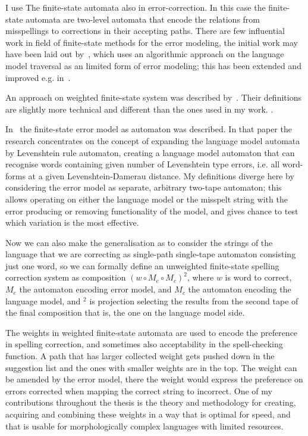 \documentclass[officiallayout,draft]{unihelcompling}
\begin{document}
I use The finite-state automata also in error-correction. In this case the
finite-state automata are two-level automata that encode the relations from
misspellings to corrections in their accepting paths. There are few influential
work in field of finite-state methods for the error modeling, the initial work
may have been laid out by~\citet{oflazer1996errortolerant}, which uses an
algorithmic approach on the language model traversal as an limited form of
error modeling; this has been extended and improved e.g. 
in~\citet{hulden2009fast}. 

An approach on weighted finite-state system was described
by~\citet{mohri2003edit}. Their definitions are slightly more technical and
different than the ones used in my work. .

In~\citet{agata2002typographical} the finite-state error model as automaton was
described. In that paper the research concentrates on the concept of expanding
the language model automata by Levenshtein rule automaton, creating a language
model automaton that can recognise words containing given number of Levenshtein
type errors, i.e. all word-forms at a given Levenshtein-Damerau distance. My
definitions diverge here by considering the error model as separate, arbitrary
two-tape automaton; this allows operating on either the language model or the
misspelt string with the error producing or removing functionality of the
model, and gives chance to test which variation is the most effective. 

Now we can also make the generalisation as to consider the strings of the
language that we are correcting as single-path single-tape automaton consisting
just one word, so we can formally define an unweighted finite-state spelling
correction system as composition $(w \circ M_e \circ M_c)^2$, where $w$ is word
to correct, $M_e$ the automaton encoding error model, and $M_c$ the automaton
encoding the language model, and $^2$ is projection selecting the results from
the second tape of the final composition that is, the one on the language
model side.

The weights in weighted finite-state automata are used to encode the preference
in spelling correction, and sometimes also acceptability in the spell-checking
function. A path that has larger collected weight gets pushed down in the
suggestion list and the ones with smaller weights are in the top. The weight
can be amended by the error model, there the weight would express the
preference on errors corrected when mapping the correct string to incorrect.
One of my contributions throughout the thesis is the
theory and methodology for creating, acquiring and combining these weights in a
way that is optimal for speed, and that is usable for morphologically complex
languages with limited resources.
\end{document}
